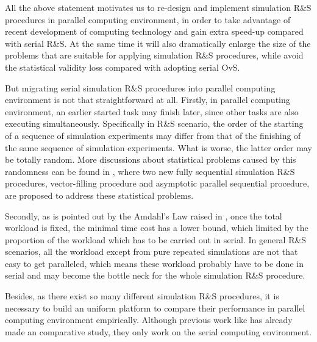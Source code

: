 \documentclass[12pt,a4paper]{report}
\begin{document}
All the above statement motivates us to re-design and implement simulation R\&S procedures in parallel computing environment, in order to take advantage of recent development of computing technology and gain extra speed-up compared with serial R\&S. At the same time it will also dramatically enlarge the size of the problems that are suitable for applying simulation R\&S procedures, while avoid the statistical validity loss compared with adopting serial OvS.

But migrating serial simulation R\&S procedures into parallel computing environment is not that straightforward at all. Firstly, in parallel computing environment, an earlier started task may finish later, since other tasks are also executing simultaneously. Specifically in R\&S scenario, the order of the starting of a sequence of simulation experiments may differ from that of the finishing of the same sequence of simulation experiments. What is worse, the latter order may be totally random. More discussions about statistical problems caused by this randomness can be found in \cite{ras-seq-parallel}, where two new fully sequential simulation R\&S procedures, vector-filling procedure and asymptotic parallel sequential procedure, are proposed to address these statistical problems.

Secondly, as is pointed out by the Amdahl's Law raised in \cite{amdahl}, once the total workload is fixed, the minimal time cost has a lower bound, which limited by the proportion of the workload which has to be carried out in serial. In general R\&S scenarios, all the workload except from pure repeated simulations are not that easy to get paralleled, which means these workload probably have to be done in serial and may become the bottle neck for the whole simulation R\&S procedure.

Besides, as there exist so many different simulation R\&S procedures, it is necessary to build an uniform platform to compare their performance in parallel computing environment empirically. Although previous work like \cite{ms05ras} has already made an comparative study, they only work on the serial computing environment.
\end{document}
